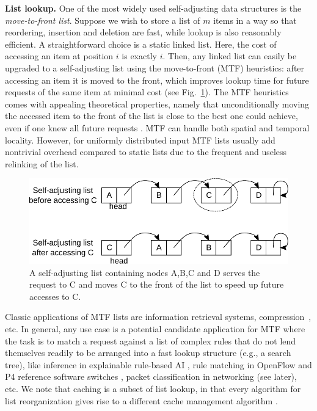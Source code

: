 \noindent%
\textbf{List lookup.} %
One of the most widely used self-adjusting data structures is the \emph{move-to-front list}. Suppose we wish to store a list of $m$ items in a way so that reordering, insertion and deletion are fast, while lookup is also reasonably efficient. A straightforward choice is a static linked list. Here, the cost of accessing an item at position $i$ is exactly $i$. Then, any linked list can easily be upgraded to a self-adjusting list using the move-to-front (MTF) heuristics: after accessing an item it is moved to the front, which improves lookup time for future requests of the same item at minimal cost (see Fig.~\ref{fig:mtf-example}). The MTF heuristics comes with appealing theoretical properties, namely that unconditionally moving the accessed item to the front of the list is close to the best one could achieve, even if one knew all future requests \cite{SleatorT85}. MTF can handle both spatial and temporal locality. However, for uniformly distributed input MTF lists usually add nontrivial overhead compared to static lists due to the frequent and useless relinking of the list.

\begin{figure}
  \centering
  \includegraphics[width=.85\linewidth]{fig/mtf.pdf}
  \caption{A self-adjusting list containing nodes A,B,C and D serves the request to C and moves C to the front of the list to speed up future accesses to C.}
  \label{fig:mtf-example}
\end{figure}

Classic applications of MTF lists are information retrieval systems, compression~\cite{BentleySTW86}, etc. In general, any use case is a potential candidate application for MTF where the task is to match a request against a list of complex rules that do not lend themselves readily to be arranged into a fast lookup structure (e.g., a search tree), like inference in explainable rule-based AI %
\cite{dovsilovic2018explainable}, rule matching in OpenFlow and P4 reference software switches \cite{openflow}, packet classification in networking (see later), etc.  We note that caching is a subset of list lookup, in that every algorithm for list reorganization gives rise to a different cache management algorithm \cite{SleatorT85}.  

